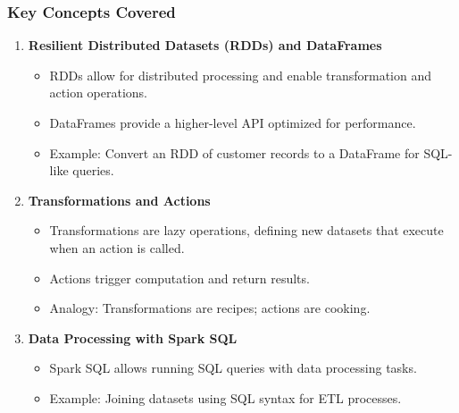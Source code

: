 \documentclass[aspectratio=169]{beamer}
\begin{document}
\begin{frame}[fragile]
    \frametitle{Key Concepts Covered}
    \begin{enumerate}
        \item \textbf{Resilient Distributed Datasets (RDDs) and DataFrames}
        \begin{itemize}
            \item RDDs allow for distributed processing and enable transformation and action operations.
            \item DataFrames provide a higher-level API optimized for performance.
            \item Example: Convert an RDD of customer records to a DataFrame for SQL-like queries.
        \end{itemize}

        \item \textbf{Transformations and Actions}
        \begin{itemize}
            \item Transformations are lazy operations, defining new datasets that execute when an action is called.
            \item Actions trigger computation and return results.
            \item Analogy: Transformations are recipes; actions are cooking.
        \end{itemize}

        \item \textbf{Data Processing with Spark SQL}
        \begin{itemize}
            \item Spark SQL allows running SQL queries with data processing tasks.
            \item Example: Joining datasets using SQL syntax for ETL processes.
        \end{itemize}
    \end{enumerate}
\end{frame}
\end{document}
